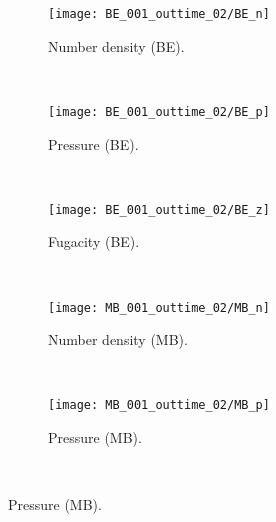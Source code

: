 \documentclass{rsproca}%
\begin{document}
\begin{figure}
        \centering
        \begin{subfigure}[b]{0.32\textwidth}
                \centering
                \texttt{[image: BE\_001\_outtime\_02/BE\_n]}
                \caption{Number density (BE).}
                \label{fig:5ESBGK_BE_n_tau001}
        \end{subfigure}%
        ~ %
        \begin{subfigure}[b]{0.32\textwidth}
                \centering
                \texttt{[image: BE\_001\_outtime\_02/BE\_p]}
                \caption{Pressure (BE).}
                \label{fig:5ESBGK_BE_p_tau001}
        \end{subfigure}
        ~ %
        \begin{subfigure}[b]{0.32\textwidth}
                \centering
                \texttt{[image: BE\_001\_outtime\_02/BE\_z]}
                \caption{Fugacity (BE).}
                \label{fig:5ESBGK_BE_z2}
        \end{subfigure}
				~ %
        \begin{subfigure}[b]{0.32\textwidth}
                \centering
                \texttt{[image: MB\_001\_outtime\_02/MB\_n]}
                \caption{Number density (MB).}
                \label{fig:5ESBGK_MB_n2_tau001}
        \end{subfigure}
        ~ %
        \begin{subfigure}[b]{0.32\textwidth}
                \centering
                \texttt{[image: MB\_001\_outtime\_02/MB\_p]}
                \caption{Pressure (MB). }
                \label{fig:5ESBGK_MB_p_tau001}
        \end{subfigure}
				~ %

\end{figure}
\end{document}
